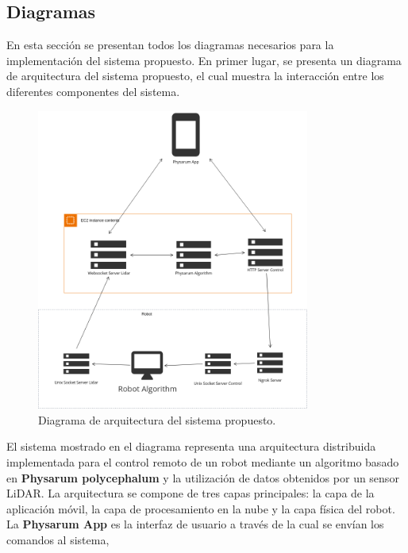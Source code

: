 \subsection{Diagramas} %
\label{sub:Diagramas}


        En esta secci\'on se presentan todos los diagramas necesarios para la implementaci\'on del sistema propuesto.
        En primer lugar, se presenta un diagrama de arquitectura del sistema propuesto, el cual muestra la interacci\'on 
        entre los diferentes componentes del sistema.
        \vskip 0.5cm
            \begin{figure}[htbp]
                \centering
                \includegraphics[width=0.8\textwidth]{images/desarrollo/diagramas/ArquitecturaSistema.png}
                \caption{Diagrama de arquitectura del sistema propuesto.}
                \label{fig:ArquitecturaSistema}
            \end{figure}
        \vskip 0.5cm
        El sistema mostrado en el diagrama representa una arquitectura distribuida implementada para el control remoto 
        de un robot mediante un algoritmo basado en \textbf{Physarum polycephalum} y la utilizaci\'on de datos obtenidos por un sensor LiDAR. 
        La arquitectura se compone de tres capas principales: la capa de la aplicaci\'on m\'ovil, la capa de procesamiento en la nube 
        y la capa f\'isica del robot.
        \vskip 0.5cm
        La \textbf{Physarum App} es la interfaz de usuario a trav\'es de la cual se env\'ian los comandos al sistema, 
